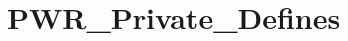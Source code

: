 \hypertarget{group___p_w_r___private___defines}{\section{P\-W\-R\-\_\-\-Private\-\_\-\-Defines}
\label{group___p_w_r___private___defines}
}
